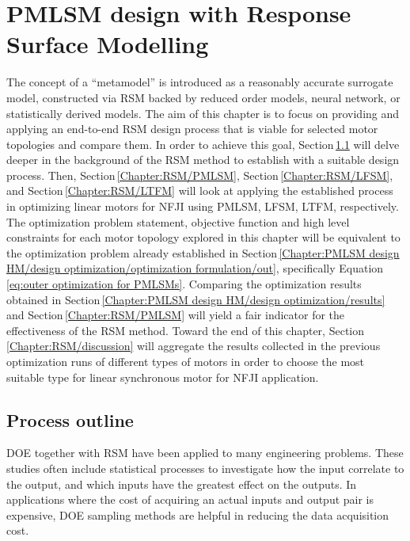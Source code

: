 \chapter{PMLSM design with Response Surface Modelling}   \label{Chapter:PMLSM design RSM}


    The concept of a “metamodel” is introduced as a reasonably accurate surrogate model, constructed via \acf{RSM} backed by reduced order models, neural network, or statistically derived models. The aim of this chapter is to focus on providing and applying an end-to-end \acs{RSM} design process that is viable for selected motor topologies and compare them. In order to achieve this goal, Section\,\ref{Chapter:RSM/outline} will delve deeper in the background of the \acs{RSM} method to establish with a suitable design process. Then, Section\,\ref{Chapter:RSM/PMLSM}, Section\,\ref{Chapter:RSM/LFSM}, and Section\,\ref{Chapter:RSM/LTFM} will look at applying the established process in optimizing linear motors for \acs{NFJI} using \acf{PMLSM}, \acf{LFSM}, \acf{LTFM}, respectively. The optimization problem statement, objective function and high level constraints for each motor topology explored in this chapter will be equivalent to the optimization problem already established in Section\,\ref{Chapter:PMLSM design HM/design optimization/optimization formulation/out}, specifically Equation\,\ref{eq:outer optimization for PMLSMs}. Comparing the optimization results obtained in Section\,\ref{Chapter:PMLSM design HM/design optimization/results} and Section\,\ref{Chapter:RSM/PMLSM} will yield a fair indicator for the effectiveness of the \ac{RSM} method. Toward the end of this chapter, Section\,\ref{Chapter:RSM/discussion} will aggregate the results collected in the previous optimization runs of different types of motors in order to choose the most suitable type for linear synchronous motor for \acs{NFJI} application.


    \section{Process outline}                        \label{Chapter:RSM/outline}
    
    
        \acf{DOE} together with \ac{RSM} have been applied to many engineering problems. These studies often include statistical processes to investigate how the input correlate to the output, and which inputs have the greatest effect on the outputs. In applications where the cost of acquiring an actual inputs and output pair is expensive, \ac{DOE} sampling methods are helpful in reducing the data acquisition cost. 
        
